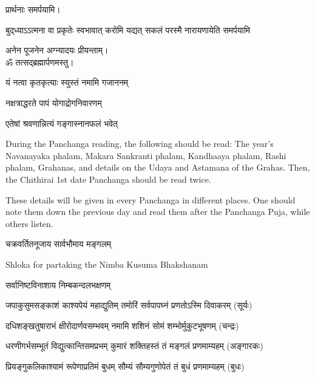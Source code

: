 प्रार्थनाः समर्पयामि।

{बुद्‌ध्याऽऽत्मना वा प्रकृतेः स्वभावात्}
{करोमि यद्यत् सकलं परस्मै}
{नारायणायेति समर्पयामि}

अनेन पूजनेन अग्न्यादयः प्रीयन्ताम्।\\

ॐ तत्सद्ब्रह्मार्पणमस्तु।


{यं नत्वा कृतकृत्याः स्युस्तं नमामि गजाननम्}

{नक्षत्राद्धरते पापं योगाद्रोगनिवारणम्}

{एतेषां श्रवणान्नित्यं गङ्गास्नानफलं भवेत्}

{\sffamily During the Panchanga reading, the following should be read:
The year’s Navanayaka phalam,
Makara Sankranti phalam,
Kandhaaya phalam,
Rashi phalam,
Grahanas, and
details on the Udaya and Astamana of the Grahas.
Then, the Chithirai 1st date Panchanga should be read twice.

\hspace{2ex} These details will be given in every Panchanga in different places. One should note them down the previous day and read them after the Panchanga Puja, while others listen.}

{चक्रवर्तितनूजाय सार्वभौमाय मङ्गलम्}

\closesection

\centerline{\textsf{Shloka for partaking the Nimba Kusuma Bhakshanam}}

{सर्वानिष्टविनाशाय निम्बकन्दलभक्षणम्}


\twolineshloka
{जपाकुसुमसङ्काशं काश्यपेयं महाद्युतिम्}
{तमोरिं सर्वपापघ्नं प्रणतोऽस्मि दिवाकरम्}
\hfill (सूर्यः)

\twolineshloka
{दधिशङ्खतुषाराभं क्षीरोदार्णवसम्भवम्}
{नमामि शशिनं सोमं शम्भोर्मुकुटभूषणम्}
\hfill (चन्द्रः)

\twolineshloka
{धरणीगर्भसम्भूतं विद्युत्कान्तिसमप्रभम्}
{कुमारं शक्तिहस्तं तं मङ्गलं प्रणमाम्यहम्}
\hfill (अङ्गारकः)

\twolineshloka
{प्रियङ्गुकलिकाश्यामं रूपेणाप्रतिमं बुधम्}
{सौम्यं सौम्यगुणोपेतं तं बुधं प्रणमाम्यहम्}
\hfill (बुधः)

